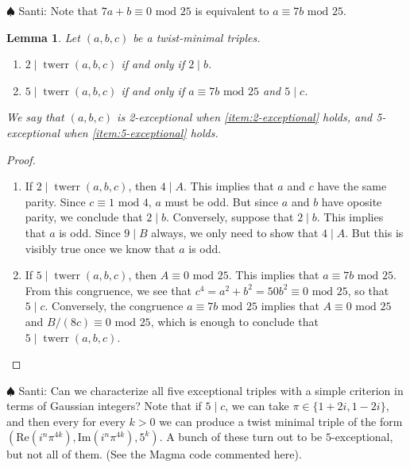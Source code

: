 \documentclass[12pt]{amsart}
\newcounter{counter}[section] %
\numberwithin{equation}{section} %
\newtheorem{lemma}[counter]{Lemma}
\theoremstyle{definition} \newtheorem{definition}[counter]{Definition}
\theoremstyle{remark} \newtheorem{nonexam}[counter]{Non-example}
\newcommand{\md}{\text{ mod }} %
\newcommand{\cdef}[1]{\textsf{#1}} %
\renewcommand{\Re}{\mathrm{Re}} %
\renewcommand{\Im}{\mathrm{Im}} %
\newcommand{\santi}[1]{{\color{cyan} \sf
    $\spadesuit$ Santi: #1}}
\DeclareMathOperator{\twerr}{twerr} %
\begin{document}
\santi{Note that $7a + b \equiv 0 \md 25$ is equivalent to $a \equiv 7b \md
  25$.}
\begin{lemma}
  \label{lemma:exceptional-triples}
  Let $(a,b,c)$ be a twist-minimal triples.
  \begin{enumerate}[label=(\alph*)]
  \item \label{item:2-exceptional} $2 \mid \twerr(a,b,c)$ if and only if $2 \mid b$.
  \item \label{item:5-exceptional} $5 \mid \twerr(a,b,c)$ if and only if $a \equiv 7b \md 25$ and $5
    \mid c$.
  \end{enumerate}
  We say that $(a,b,c)$ is \cdef{2-exceptional} when \ref{item:2-exceptional}
  holds, and \cdef{5-exceptional} when \ref{item:5-exceptional} holds.
\end{lemma}
\begin{proof}
  \hfill
  \begin{enumerate}[label=(\alph*)]
  \item If $2 \mid \twerr(a,b,c)$, then $4 \mid A$. This implies that $a$ and
    $c$ have the same parity. Since $c \equiv 1 \md 4$, $a$ must be odd. But
    since $a$ and $b$ have oposite parity, we conclude that $2 \mid b$.
    Conversely, suppose that $2 \mid b$. This implies that $a$ is odd. Since $9
    \mid B$ always, we only need to show that $4 \mid A$. But this is visibly
    true once we know that $a$ is odd.
  \item If $5 \mid \twerr(a,b,c)$, then $A \equiv 0 \md 25$. This implies that
    $a \equiv 7b \md 25$. From this congruence, we see that $c^4 = a^2 +
    b^2 = 50b^2 \equiv 0 \md 25$, so that $5 \mid c$. Conversely, the
    congruence $a \equiv 7b \md 25$ implies that $A \equiv 0 \md 25$ and $B/(8c)
    \equiv 0 \md 25$, which is enough to conclude that $5 \mid \twerr(a,b,c)$.
  \end{enumerate}
\end{proof}
\santi{Can we characterize all five exceptional triples with a simple criterion
in terms of Gaussian integers? Note that if $5 \mid c$, we can take $\pi \in
\{1 + 2i, 1-2i\}$, and then every for every $k > 0$ we can produce a twist
minimal triple of the form $(\Re(i^n\pi^{4k}), \Im(i^n\pi^{4k}), 5^k)$. A bunch of
these turn out to be $5$-exceptional, but not all of them. (See the Magma code
commented here)}.


\end{document}
